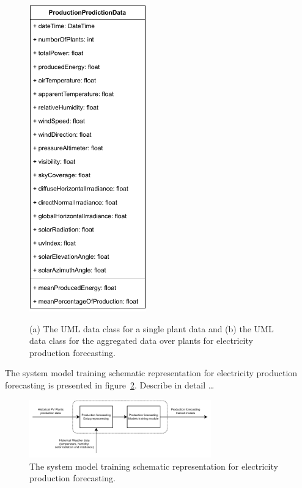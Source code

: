 \begin{figure}[H]
\begin{minipage}[b]{8.5cm}
\includegraphics[width=0.45\textwidth]{images/production_prediction_uml}
\subcaption{}
\label{fig:umlproduction}
\end{minipage}
\caption{(a) The UML data class for a single plant data and (b) the UML data class for the aggregated data over plants for electricity production forecasting.}
\end{figure}

The system model training schematic representation for electricity production forecasting is presented in figure~\ref{fig:modeltrainingproduction}.
Describe in detail …

\begin{figure}[H]
\centering
\includegraphics[width=0.7\textwidth]{images/system_model_training_production}
\caption{The system model training schematic representation for electricity production forecasting.}
\label{fig:modeltrainingproduction}
\end{figure}

